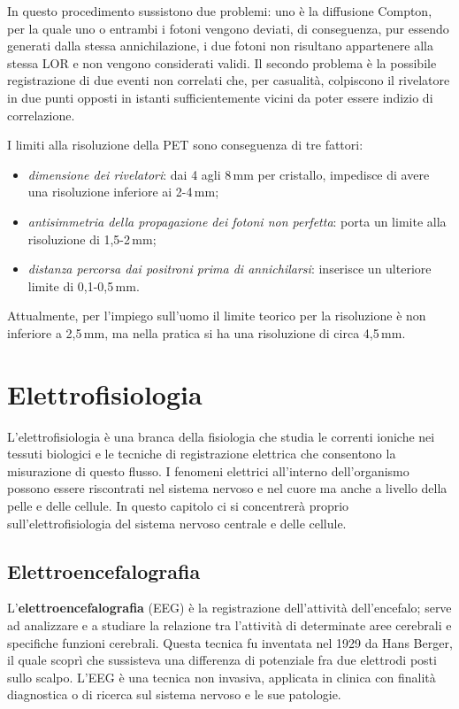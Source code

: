 \documentclass{report}
\numberwithin{equation}{section}
\numberwithin{figure}{section}
\begin{document}
In questo procedimento sussistono due problemi: uno è la diffusione Compton, per la quale uno o entrambi i fotoni vengono deviati, di conseguenza, pur essendo generati dalla stessa annichilazione, i due fotoni non risultano appartenere alla stessa LOR e non vengono considerati validi. Il secondo problema è la possibile registrazione di due eventi non correlati che, per casualità, colpiscono il rivelatore in due punti opposti in istanti sufficientemente vicini da poter essere indizio di correlazione.

I limiti alla risoluzione della PET sono conseguenza di tre fattori:
\begin{itemize}[label=$-$]
    \item \emph{dimensione dei rivelatori}: dai 4 agli 8\,mm per cristallo, impedisce di avere una risoluzione inferiore ai 2-4\,mm;
    \item \emph{antisimmetria della propagazione dei fotoni non perfetta}: porta un limite alla risoluzione di 1,5-2\,mm;
    \item \emph{distanza percorsa dai positroni prima di annichilarsi}: inserisce un ulteriore limite di 0,1-0,5\,mm.
\end{itemize}
Attualmente, per l’impiego sull'uomo il limite teorico per la risoluzione è non inferiore a 2,5\,mm, ma nella pratica si ha una risoluzione di circa 4,5\,mm.

\clearpage
\null
\newpage

\chapter{Elettrofisiologia}
L'elettrofisiologia è una branca della fisiologia che studia le correnti ioniche nei tessuti biologici e le tecniche di registrazione elettrica che consentono la misurazione di questo flusso. I fenomeni elettrici all'interno dell'organismo possono essere riscontrati nel sistema nervoso e nel cuore ma anche a livello della pelle e delle cellule. In questo capitolo ci si concentrerà proprio sull'elettrofisiologia del sistema nervoso centrale e delle cellule.

\section{Elettroencefalografia}
L'\textbf{elettroencefalografia} (EEG) è la registrazione dell'attività dell'encefalo; serve ad analizzare e a studiare la relazione tra l’attività di determinate aree cerebrali e specifiche funzioni cerebrali. Questa tecnica fu inventata nel 1929 da Hans Berger, il quale scoprì che sussisteva una differenza di potenziale fra due elettrodi posti sullo scalpo. L'EEG è una tecnica non invasiva, applicata in clinica con finalità diagnostica o di ricerca sul sistema nervoso e le sue patologie.
\end{document}
